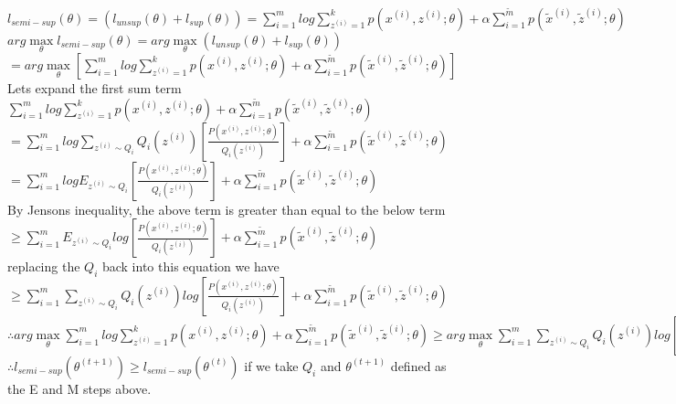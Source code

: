 \begin{answer}\\
$l_{semi-sup}(\theta)=(l_{unsup}(\theta)+l_{sup}(\theta))=\sum_{i=1}^{m} log \sum_{z^{(i)}=1}^{k} p(x^{(i)},z^{(i)};\theta)+ \alpha \sum_{i=1}^{\tilde{m}}p(\tilde{x}^{(i)},\tilde{z}^{(i)};\theta)$\\
$arg \max\limits_{\theta} l_{semi-sup}(\theta)=arg \max\limits_{\theta} (l_{unsup}(\theta)+l_{sup}(\theta))$\\
$=arg \max\limits_{\theta} \left [ \sum_{i=1}^{m} log \sum_{z^{(i)}=1}^{k} p(x^{(i)},z^{(i)};\theta)+ \alpha \sum_{i=1}^{\tilde{m}}p(\tilde{x}^{(i)},\tilde{z}^{(i)};\theta) \right ]$\\
Lets expand the first sum term\\
$\sum_{i=1}^{m} log \sum_{z^{(i)}=1}^{k} p(x^{(i)},z^{(i)};\theta)+ \alpha \sum_{i=1}^{\tilde{m}}p(\tilde{x}^{(i)},\tilde{z}^{(i)};\theta)$\\
$=\sum_{i=1}^{m} log \sum_{z^{(i)}\sim Q_i}Q_i(z^{(i)}) \left [ \frac{P(x^{(i)},z^{(i)};\theta)}{Q_i(z^{(i)})} \right] + \alpha \sum_{i=1}^{\tilde{m}}p(\tilde{x}^{(i)},\tilde{z}^{(i)};\theta)$\\
$=\sum_{i=1}^{m} log E_{z^{(i)} \sim Q_i} \left [ \frac{P(x^{(i)},z^{(i)};\theta)}{Q_i(z^{(i)})} \right] + \alpha \sum_{i=1}^{\tilde{m}}p(\tilde{x}^{(i)},\tilde{z}^{(i)};\theta)$\\
By Jensons inequality, the above term is greater than equal to the below term\\
$\geq \sum_{i=1}^{m} E_{z^{(i)} \sim Q_i} log \left [ \frac{P(x^{(i)},z^{(i)};\theta)}{Q_i(z^{(i)})} \right] + \alpha \sum_{i=1}^{\tilde{m}}p(\tilde{x}^{(i)},\tilde{z}^{(i)};\theta)$\\
replacing the $Q_i$ back into this equation we have\\
$\geq \sum_{i=1}^{m} \sum_{z^{(i)}\sim Q_i}Q_i(z^{(i)}) log \left [ \frac{P(x^{(i)},z^{(i)};\theta)}{Q_i(z^{(i)})} \right] + \alpha \sum_{i=1}^{\tilde{m}}p(\tilde{x}^{(i)},\tilde{z}^{(i)};\theta)$\\
$\therefore arg \max\limits_{\theta} \sum_{i=1}^{m} log \sum_{z^{(i)}=1}^{k} p(x^{(i)},z^{(i)};\theta)+ \alpha \sum_{i=1}^{\tilde{m}}p(\tilde{x}^{(i)},\tilde{z}^{(i)};\theta) \geq arg \max\limits_{\theta}\sum_{i=1}^{m} \sum_{z^{(i)}\sim Q_i}Q_i(z^{(i)}) log \left [ \frac{P(x^{(i)},z^{(i)};\theta)}{Q_i(z^{(i)})} \right] + \alpha \sum_{i=1}^{\tilde{m}}p(\tilde{x}^{(i)},\tilde{z}^{(i)};\theta)$\\
$\therefore l_{semi-sup}(\theta^{(t+1)}) \geq l_{semi-sup}(\theta^{(t)})$ if we take $Q_i$ and $\theta^{(t+1)}$ defined as the E and M steps above.
\end{answer}